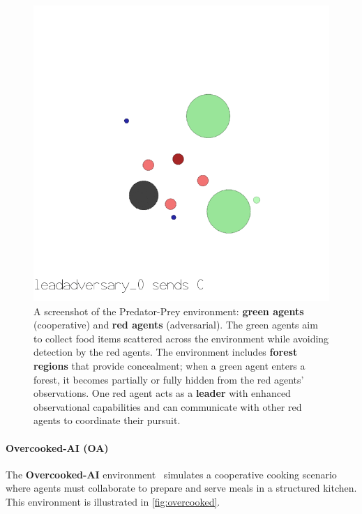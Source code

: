 \documentclass[pdflatex,sn-mathphys-num]{sn-jnl}%
\theoremstyle{thmstyleone}%
\theoremstyle{thmstyletwo}%
\theoremstyle{thmstylethree}%
\begin{document}
\begin{figure}[h!]
    \centering
    \includegraphics[width=0.6\linewidth]{figures/predator_prey.png}
    \caption{A screenshot of the Predator-Prey environment: \textbf{green agents} (cooperative) and \textbf{red agents} (adversarial). The green agents aim to collect food items scattered across the environment while avoiding detection by the red agents. The environment includes \textbf{forest regions} that provide concealment; when a green agent enters a forest, it becomes partially or fully hidden from the red agents' observations. One red agent acts as a \textbf{leader} with enhanced observational capabilities and can communicate with other red agents to coordinate their pursuit.}
    \label{fig:predator_prey}
\end{figure}

\paragraph{Overcooked-AI (OA)}
The \textbf{Overcooked-AI} environment~\cite{Carroll2019} simulates a cooperative cooking scenario where agents must collaborate to prepare and serve meals in a structured kitchen. This environment is illustrated in \autoref{fig:overcooked}.
\end{document}
